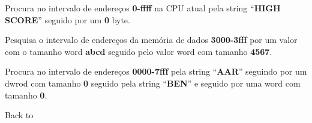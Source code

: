 \documentclass[letterpaper,10pt,brazil]{sphinxmanual}
\begin{document}
\begin{DUlineblock}{0em}
\item[]
\begin{DUlineblock}{\DUlineblockindent}
\item[] 
\item[] 
\end{DUlineblock}
\item[] Procura no intervalo de endereços \textbf{0-ffff} na CPU atual pela string ``\textbf{HIGH SCORE}'' seguido por um \textbf{0} byte.
\item[] 
\item[]
\begin{DUlineblock}{\DUlineblockindent}
\item[] 
\item[] 
\end{DUlineblock}
\item[] Pesquisa o intervalo de endereços da memória de dados \textbf{3000-3fff} por um valor com o tamanho word \textbf{abcd} seguido pelo valor word com tamanho \textbf{4567}.
\item[] 
\item[]
\begin{DUlineblock}{\DUlineblockindent}
\item[] 
\item[] 
\end{DUlineblock}
\item[] Procura no intervalo de endereços \textbf{0000-7fff} pela string ``\textbf{AAR}'' seguindo por um dwrod com tamanho \textbf{0} seguido pela string ``\textbf{BEN}'' e seguido por uma word com tamanho \textbf{0}.
\item[] 
\item[] Back to {\hyperref[debugger/memory:debugger\string-memory\string-list]{}}
\end{DUlineblock}
\begin{quote}
\label{debugger/memory:debugger-command-dump}\end{quote}
\end{document}
